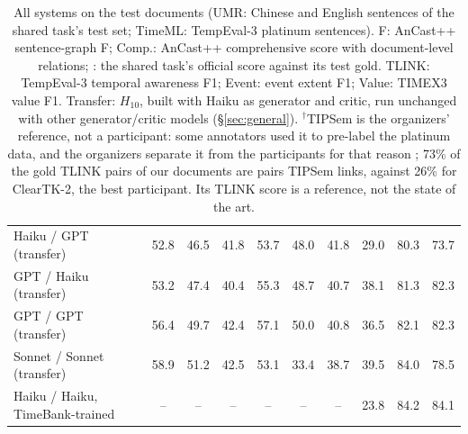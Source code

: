 \begin{table}[t]
\begin{tabular}{@{}lccccccccc@{}}
Haiku / GPT (transfer) & 52.8 & 46.5 & 41.8 & 53.7 & 48.0 & 41.8 & 29.0 & 80.3 & 73.7 \\
GPT / Haiku (transfer) & 53.2 & 47.4 & 40.4 & 55.3 & 48.7 & 40.7 & 38.1 & 81.3 & 82.3 \\
GPT / GPT (transfer) & 56.4 & 49.7 & 42.4 & 57.1 & 50.0 & 40.8 & 36.5 & 82.1 & 82.3 \\
Sonnet / Sonnet (transfer) & 58.9 & 51.2 & 42.5 & 53.1 & 33.4 & 38.7 & 39.5 & 84.0 & 78.5 \\
Haiku / Haiku, TimeBank-trained & -- & -- & -- & -- & -- & -- & 23.8 & 84.2 & 84.1 \\
\bottomrule
\end{tabular}
\caption{All systems on the test documents (UMR: \nTestZh Chinese and \nTestEn English sentences of the shared task's test set; TimeML: \nTestTml TempEval-3 platinum sentences). F: AnCast++ sentence-graph F; Comp.: AnCast++ comprehensive score with document-level relations; \jumach{}: the shared task's official score against its test gold. TLINK: TempEval-3 temporal awareness F1; Event: event extent F1; Value: TIMEX3 value F1. Transfer: $H_{10}$, built with Haiku as generator and critic, run unchanged with other generator/critic models (\S\ref{sec:general}). $^\dagger$TIPSem \citep{llorens2010tipsem} is the organizers' reference, not a participant: some annotators used it to pre-label the platinum data, and the organizers separate it from the participants for that reason \citep{uzzaman2013semeval}; 73\% of the gold TLINK pairs of our documents are pairs TIPSem links, against 26\% for ClearTK-2, the best participant. Its TLINK score is a reference, not the state of the art.}
\label{tab:main}
\end{table}
